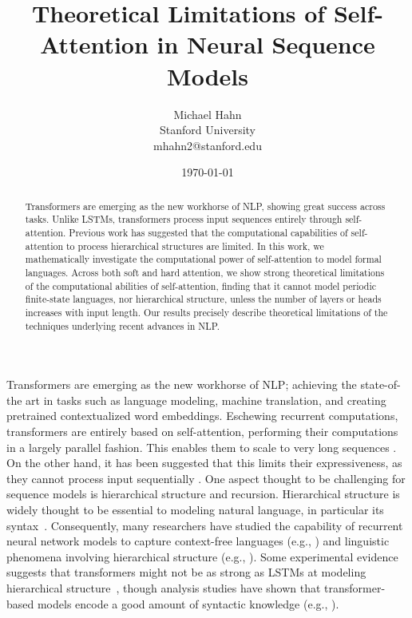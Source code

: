 \documentclass[11pt,a4paper]{article}
\title{Theoretical Limitations of Self-Attention in Neural Sequence Models}
\author{Michael Hahn \\ Stanford University \\ mhahn2@stanford.edu}
\date{\today}
\begin{document}
\maketitle
\begin{abstract}
Transformers are emerging as the new workhorse of NLP, showing great success across tasks.
Unlike LSTMs, transformers process input sequences entirely through self-attention.
Previous work has suggested that the computational capabilities of self-attention to process hierarchical structures are limited.
In this work, we mathematically investigate the computational power of self-attention to model formal languages.
Across both soft and hard attention, we show strong theoretical limitations of the computational abilities of self-attention, finding that it cannot model periodic finite-state languages, nor hierarchical structure, unless the number of layers or heads increases with input length.
Our results precisely describe theoretical limitations of the techniques underlying recent advances in NLP.
\end{abstract}


Transformers are emerging as the new workhorse of NLP; achieving the state-of-the art in tasks such as language modeling, machine translation, and creating pretrained contextualized word embeddings.
Eschewing recurrent computations, transformers are entirely based on self-attention, performing their computations in a largely parallel fashion.
This enables them to scale to very long sequences \cite{vaswani2017attention,dai2019transformer,child2019generating}.
On the other hand, it has been suggested that this limits their expressiveness, as they cannot process input sequentially \cite{tran2018importance,dehghani2018universal,shen2018disan,chen2018best,hao2019modeling}.
One aspect thought to be challenging for sequence models is hierarchical structure and recursion.
Hierarchical structure is widely thought to be essential to modeling natural language, in particular its syntax~\cite{everaert2015structures}.
Consequently, many researchers have studied the capability of recurrent neural network models to capture context-free languages (e.g., \citet{kalinke1998computation,gers2001lstm,gruning2006stack,weiss2018practical,sennhauser2018evaluating}) and linguistic phenomena involving hierarchical structure (e.g., \citet{linzen2016assessing,gulordava2018colorless}).
Some experimental evidence suggests that transformers might not be as strong as LSTMs at modeling hierarchical structure~\cite{tran2018importance}, though analysis studies have shown that transformer-based models encode a good amount of syntactic knowledge (e.g., \citet{clark2019bert,lin2019open,tenney2019bert}).
\end{document}
